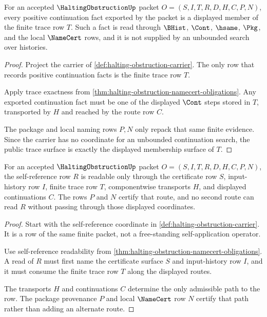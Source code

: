 \begin{theorem}
\label{thm:halting-obstruction-trace-coverage}
For an accepted $\HaltingObstructionUp$ packet $O=(S,I,T,R,D,H,C,P,N)$, every positive continuation fact exported by the packet is a displayed member of the finite trace row $T$. Such a fact is read through $\BHist$, $\Cont$, $\hsame$, $\Pkg$, and the local $\NameCert$ rows, and it is not supplied by an unbounded search over histories.
\end{theorem}
\begin{proof}
Project the carrier of \autoref{def:halting-obstruction-carrier}. The only row that records positive continuation facts is the finite trace row $T$.

Apply trace exactness from \autoref{thm:halting-obstruction-namecert-obligations}. Any exported continuation fact must be one of the displayed $\Cont$ steps stored in $T$, transported by $H$ and reached by the route row $C$.

The package and local naming rows $P,N$ only repack that same finite evidence. Since the carrier has no coordinate for an unbounded continuation search, the public trace surface is exactly the displayed membership surface of $T$.
\end{proof}

\begin{theorem}
\label{thm:halting-obstruction-self-reference-route-determinacy}
For an accepted $\HaltingObstructionUp$ packet $O=(S,I,T,R,D,H,C,P,N)$, the self-reference row $R$ is readable only through the certificate row $S$, input-history row $I$, finite trace row $T$, componentwise transports $H$, and displayed continuations $C$. The rows $P$ and $N$ certify that route, and no second route can read $R$ without passing through those displayed coordinates.
\end{theorem}
\begin{proof}
Start with the self-reference coordinate in \autoref{def:halting-obstruction-carrier}. It is a row of the same finite packet, not a free-standing self-application operator.

Use self-reference readability from \autoref{thm:halting-obstruction-namecert-obligations}. A read of $R$ must first name the certificate surface $S$ and input-history row $I$, and it must consume the finite trace row $T$ along the displayed routes.

The transports $H$ and continuations $C$ determine the only admissible path to the row. The package provenance $P$ and local $\NameCert$ row $N$ certify that path rather than adding an alternate route.
\end{proof}

